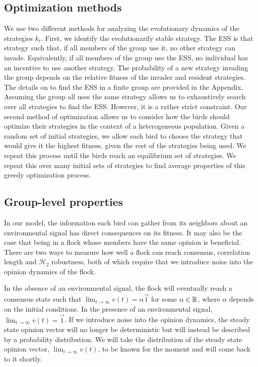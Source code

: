 \documentclass{article}
\begin{document}
\subsection{Optimization methods }
We use two different methods for analyzing the evolutionary dynamics of the strategies $k_i$.  First, we identify the evolutionarily stable strategy.  The ESS is that strategy such that, if all members of the group use it, no other strategy can invade. Equivalently, if all members of the group use the ESS, no individual has an incentive to use another strategy. The probability of a new strategy invading the group depends on the relative fitness of the invader and resident strategies. The details on to find the ESS in a finite group are provided in the Appendix. Assuming the group all uses the same strategy allows us to exhaustively search over all strategies to find the ESS. However, it is a rather strict constraint. Our second method of optimization allows us to consider how the birds should optimize their strategies in the context of a heterogeneous population.  Given a random set of initial strategies, we allow each bird to choose the strategy that would give it the highest fitness, given the rest of the strategies being used. We repeat this process until the birds reach an equilibrium set of strategies. We repeat this over many initial sets of strategies to find average properties of this greedy optimization process.

\subsection{Group-level properties }
In our model, the information each bird can gather from its neighbors about an environmental signal has direct consequences on its fitness.  It may also be the case that being in a flock whose members have the same opinion is beneficial.  There are two ways to measure how well a flock can reach consensus, correlation length and $\mathscr{H}_2$ robustness, both of which require that we introduce noise into the opinion dynamics of the flock.  

In the absence of an environmental signal, the flock will eventually reach a consensus state such that $\lim_{t\to\infty}v(t)=\alpha\vec{1}$ for some $\alpha\in{\mathbb{R}}$, where $\alpha$ depends on the initial conditions. In the presence of an environmental signal, $\lim_{t\to\infty}v(t)=\vec{1}$. If we introduce noise into the opinion dynamics, the steady state opinion vector will no longer be deterministic but will instead be described by a probability distribution.  We will take the distribution of the steady state opinion vector, $\lim_{t\to\infty}v(t)$, to be known for the moment and will come back to it shortly.
\end{document}
